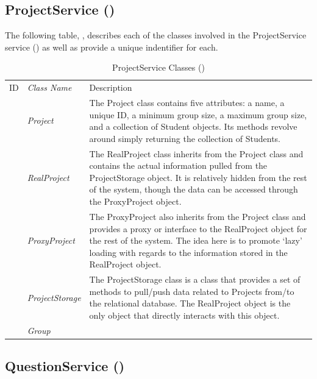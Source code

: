 \documentclass[12pt,letterpaper]{article}
\begin{document}
\subsection{ProjectService ()}

The following table, , describes each of the classes involved in the ProjectService service () as well as provide a unique indentifier for each.

\begin{table}[H]
	\caption{ProjectService Classes ()} 
	\begin{tabu} to 
	    \tableheader{}ID & Class Name & Description \\
		 & Project & The Project class contains five attributes: a name, a unique ID, a minimum group size, a maximum group size, and a collection of Student objects. Its methods revolve around simply returning the collection of Students.\\
		 & RealProject & The RealProject class inherits from the Project class and contains the actual information pulled from the ProjectStorage object. It is relatively hidden from the rest of the system, though the data can be accessed through the ProxyProject object.\\
		 & ProxyProject & The ProxyProject also inherits from the Project class and provides a proxy or interface to the RealProject object for the rest of the system. The idea here is to promote `lazy' loading with regards to the information stored in the RealProject object.\\
		 & ProjectStorage & The ProjectStorage class is a class that provides a set of methods to pull/push data related to Projects from/to the relational database. The RealProject object is the only object that directly interacts with this object.\\
		 & Group & \\
	\end{tabu}
\end{table}

\subsection{QuestionService ()}
\end{document}
